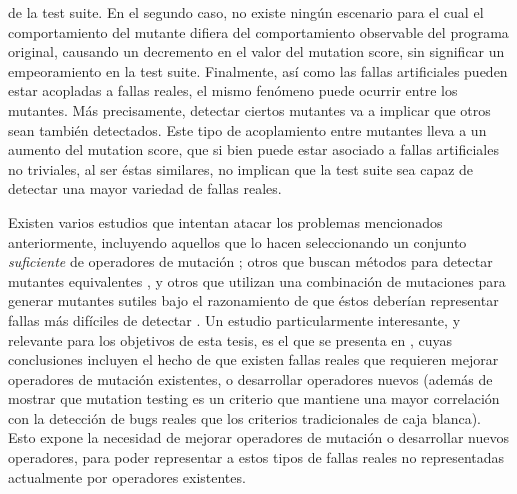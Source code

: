 de la test suite. En el segundo caso, no existe ning\'un escenario para el cual el comportamiento del mutante difiera del comportamiento observable del programa original, causando un decremento en el valor del mutation score, sin significar un empeoramiento en la test suite. Finalmente, as\'i como las fallas artificiales pueden estar acopladas a fallas reales, el mismo fen\'omeno puede ocurrir entre los mutantes. M\'as precisamente, detectar ciertos mutantes va a implicar que otros sean tambi\'en detectados. Este tipo de acoplamiento entre mutantes lleva a un aumento del mutation score, que si bien puede estar asociado a fallas artificiales no triviales, al ser \'estas similares, no implican que la test suite sea capaz de detectar una mayor variedad de fallas reales.

Existen varios estudios que intentan atacar los problemas mencionados anteriormente, incluyendo aquellos que lo hacen seleccionando un conjunto \emph{suficiente} de operadores de mutaci\'on \cite{bibliography.mutation.selection.Offutt96, bibliography.mutation.selection.ASN2008}; otros que buscan m\'etodos para detectar mutantes equivalentes \cite{biblography.mutation.evaluation.equivalent.Grun+09, biblography.mutation.evaluation.equivalent.Schuler+10, biblography.mutation.evaluation.equivalent.Just+13}, y otros que utilizan una combinaci\'on de mutaciones para generar mutantes sutiles bajo el razonamiento de que \'estos deber\'ian representar fallas m\'as dif\'iciles de detectar \cite{bibliography.mutation.highorder.Jia+08, bibliography.mutation.highorder.Jia+09, bibliography.mutation.highorder.Harman+11}. Un estudio particularmente interesante, y relevante para los objetivos de esta tesis, es el que se presenta en \cite{bibliography.mutation.evaluation.valid-substitute}, cuyas conclusiones incluyen el hecho de que existen fallas reales que requieren mejorar operadores de mutaci\'on existentes, o desarrollar operadores nuevos (adem\'as de mostrar que mutation testing es un criterio que mantiene una mayor correlaci\'on con la detecci\'on de bugs reales que los criterios tradicionales de caja blanca). Esto expone la necesidad de mejorar operadores de mutaci\'on o desarrollar nuevos operadores, para poder representar a estos tipos de fallas reales no representadas actualmente por operadores existentes.

